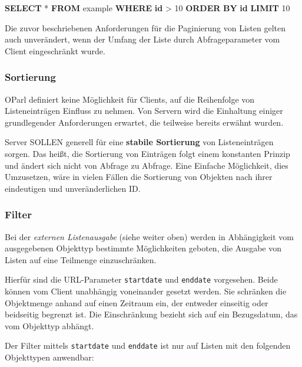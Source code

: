\documentclass[,a4paper]{article}
\newenvironment{Shaded}{}{}
\newcommand{\KeywordTok}[1]{\textcolor[rgb]{0.00,0.44,0.13}{\textbf{{#1}}}}
\newcommand{\DecValTok}[1]{\textcolor[rgb]{0.25,0.63,0.44}{{#1}}}
\newcommand{\NormalTok}[1]{{#1}}
\begin{document}
\begin{Shaded}
\begin{Highlighting}[]
\KeywordTok{SELECT} \NormalTok{* }\KeywordTok{FROM} \NormalTok{example }\KeywordTok{WHERE} \KeywordTok{id} \NormalTok{> }\DecValTok{10} \KeywordTok{ORDER} \KeywordTok{BY} \KeywordTok{id} \KeywordTok{LIMIT} \DecValTok{10}
\end{Highlighting}
\end{Shaded}

Die zuvor beschriebenen Anforderungen für die Paginierung von Listen
gelten auch unverändert, wenn der Umfang der Liste durch
Abfrageparameter vom Client eingeschränkt wurde.

\subsubsection{Sortierung}\label{sortierung}

OParl definiert keine Möglichkeit für Clients, auf die Reihenfolge von
Listeneinträgen Einfluss zu nehmen. Von Servern wird die Einhaltung
einiger grundlegender Anforderungen erwartet, die teilweise bereits
erwähnt wurden.

Server SOLLEN generell für eine \textbf{stabile Sortierung} von
Listeneinträgen sorgen. Das heißt, die Sortierung von Einträgen folgt
einem konstanten Prinzip und ändert sich nicht von Abfrage zu Abfrage.
Eine Einfache Möglichkeit, dies Umzusetzen, wäre in vielen Fällen die
Sortierung von Objekten nach ihrer eindeutigen und unveränderlichen ID.

\subsubsection{Filter}\label{filter}

Bei der \emph{externen Listenausgabe} (siehe weiter oben) werden in
Abhängigkeit vom ausgegebenen Objekttyp bestimmte Möglichkeiten geboten,
die Ausgabe von Listen auf eine Teilmenge einzuschränken.

Hierfür sind die URL-Parameter \texttt{startdate} und \texttt{enddate}
vorgesehen. Beide können vom Client unabhängig voneinander gesetzt
werden. Sie schränken die Objektmenge anhand auf einen Zeitraum ein, der
entweder einseitig oder beidseitig begrenzt ist. Die Einschränkung
bezieht sich auf ein Bezugsdatum, das vom Objekttyp abhängt.

Der Filter mittels \texttt{startdate} und \texttt{enddate} ist nur auf
Listen mit den folgenden Objekttypen anwendbar:
\end{document}
